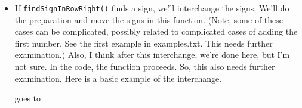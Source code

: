 \documentclass[12pt]{article}
\numberwithin{equation}{section}
\newcommand{\horizontalDominoMaybe}[3]{\filldraw [dominoMaybeStyle] (#2 - 1 + \eps, #1 - 1 + \eps) rectangle + (2 - \teps, 1 -\teps) node [dominoText] {$#3$};}
\newcommand{\verticalDominoMaybeShift}[4]{\filldraw [dominoMaybeStyle] (#2 - 1 + #4 + \eps,  #1 - 1 + \eps) rectangle + (1 - \teps,2 -\teps) node [dominoText] {$#3$};}
\newcommand{\greenCircle}[2]{\filldraw[green] (#2 - .5, #1 - .5) circle (.2cm);}
\begin{document}
\begin{itemize}
\begin{itemize}
\begin{figure}[H]
      \end{figure}
      \item If \texttt{findSignInRowRight()} finds a sign, we'll interchange the signs.
      We'll do the preparation and move the signs in this function.
      (Note, some of these cases can be complicated, possibly related to complicated cases of adding the first number.
      See the first example in examples.txt.
      This needs further examination.)
      Also, I think after this interchange, we're done here, but I'm not sure.
      In the code, the function proceeds.
      So, this also needs further examination.
      Here is a basic example of the interchange.
      \begin{figure}[H]
        \centering
      \end{figure}
      goes to
      \begin{figure}[H]
        \centering
      \end{figure}


\end{itemize}
\end{itemize}
\end{document}
